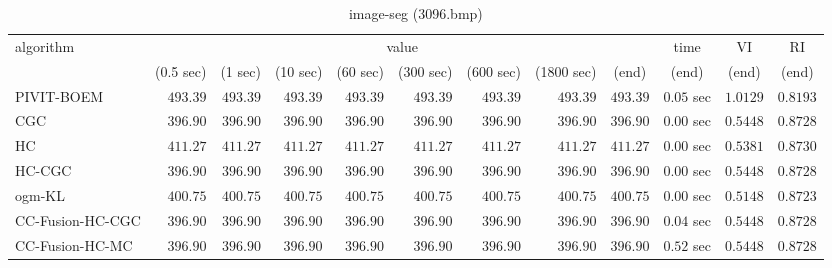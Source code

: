 \begin{table}[H]
\scriptsize
\centering
\caption{image-seg (3096.bmp)}
\label{tab:anytimetable-image-seg-3096.bmp}
\begin{tabular}{lrrrrrrrrrrr}
\toprule
           algorithm &                                   \multicolumn{8}{c}{value} & \multicolumn{1}{c}{time}    & \multicolumn{1}{c}{VI}  & \multicolumn{1}{c}{RI} \\  
\cmidrule(lr){2-9}\cmidrule(lr){10-10} \cmidrule(lr){11-11} \cmidrule(lr){12-12}   
                     & \multicolumn{1}{c}{(0.5 sec)} & \multicolumn{1}{c}{(1 sec)} & \multicolumn{1}{c}{(10 sec)} & \multicolumn{1}{c}{(60 sec)} & \multicolumn{1}{c}{(300 sec)} & \multicolumn{1}{c}{(600 sec)} & \multicolumn{1}{c}{(1800 sec)} & \multicolumn{1}{c}{(end)} & \multicolumn{1}{c}{(end)}    & \multicolumn{1}{c}{(end)}   & \multicolumn{1}{c}{(end)}  \\ \midrule 
          PIVIT-BOEM & $       493.39$ & $       493.39$ & $       493.39$ & $       493.39$ & $       493.39$ & $       493.39$ & $       493.39$ & $       493.39$ & $         0.05$ sec    & $       1.0129$  & $       0.8193$ \\ 
                 CGC & $       396.90$ & $       396.90$ & $       396.90$ & $       396.90$ & $       396.90$ & $       396.90$ & $       396.90$ & $       396.90$ & $         0.00$ sec    & $       0.5448$  & $       0.8728$ \\ 
                  HC & $       411.27$ & $       411.27$ & $       411.27$ & $       411.27$ & $       411.27$ & $       411.27$ & $       411.27$ & $       411.27$ & $         0.00$ sec    & $       0.5381$  & $       0.8730$ \\ 
              HC-CGC & $       396.90$ & $       396.90$ & $       396.90$ & $       396.90$ & $       396.90$ & $       396.90$ & $       396.90$ & $       396.90$ & $         0.00$ sec    & $       0.5448$  & $       0.8728$ \\ 
              ogm-KL & $       400.75$ & $       400.75$ & $       400.75$ & $       400.75$ & $       400.75$ & $       400.75$ & $       400.75$ & $       400.75$ & $         0.00$ sec    & $       0.5148$  & $       0.8723$ \\ 
    CC-Fusion-HC-CGC & $       396.90$ & $       396.90$ & $       396.90$ & $       396.90$ & $       396.90$ & $       396.90$ & $       396.90$ & $       396.90$ & $         0.04$ sec    & $       0.5448$  & $       0.8728$ \\ 
     CC-Fusion-HC-MC & $       396.90$ & $       396.90$ & $       396.90$ & $       396.90$ & $       396.90$ & $       396.90$ & $       396.90$ & $       396.90$ & $         0.52$ sec    & $       0.5448$  & $       0.8728$ \\ 

\end{tabular}
\end{table}
